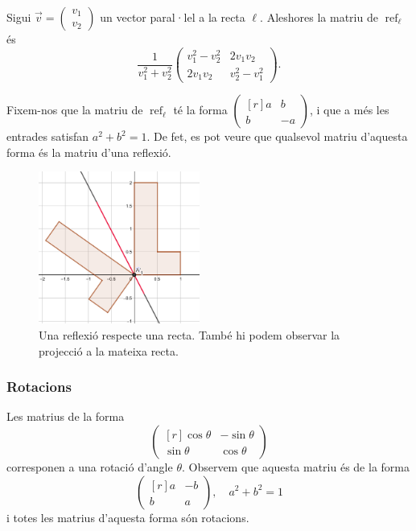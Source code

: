\begin{proposicio}\label{prop:reflexio}
	Sigui $\vec v = \begin{pmatrix}v_1\\v_2\end{pmatrix}$ un vector paral·lel a la recta $\ell$. Aleshores la matriu de $\operatorname{ref}_\ell$ és
	\[
	\frac{1}{v_1^2 + v_2^2}\begin{pmatrix}v_1^2-v_2^2&2v_1v_2\\2v_1v_2&v_2^2-v_1^2\end{pmatrix}.
	\]
\end{proposicio}
Fixem-nos que la matriu de $\operatorname{ref}_\ell$ té la forma $\begin{pmatrix*}[r]a&b\\b&-a\end{pmatrix*}$, i que a més les entrades satisfan $a^2 + b^2 = 1$. De fet, es pot veure que qualsevol matriu d'aquesta forma és la matriu d'una reflexió.

\begin{figure}[h]
    \centering
    \includegraphics[height=5cm]{reflexio.png}
    \caption{Una reflexió respecte una recta. També hi podem observar la projecció a la mateixa recta.}
    \label{fig:reflexio}
\end{figure}
\subsubsection{Rotacions}\label{subsubsec:rotacio}
Les matrius de la forma
\[
\begin{pmatrix*}[r]
\cos\theta&-\sin\theta\\
\sin\theta&\cos\theta
\end{pmatrix*}
\]
corresponen a una rotació d'angle $\theta$. Observem que aquesta matriu és de la forma
\[
\begin{pmatrix*}[r]
a&-b\\b&a
\end{pmatrix*},\quad a^2+b^2=1
\]
i totes les matrius d'aquesta forma són rotacions.

